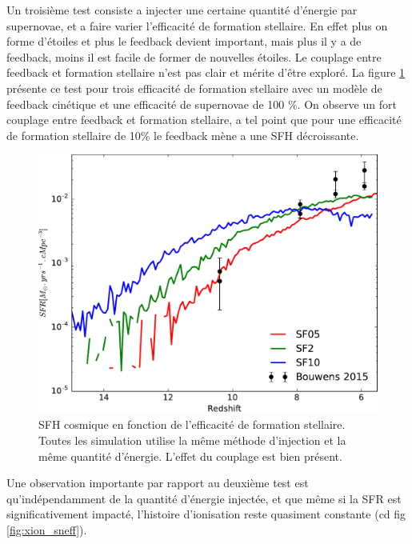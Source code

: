 Un troisième test consiste a injecter une certaine quantité d'énergie par supernovae, et a faire varier l'efficacité de formation stellaire.
En effet plus on forme d'étoiles et plus le feedback devient important, mais plus il y a de feedback, moins il est facile de former de nouvelles étoiles.
Le couplage entre feedback et formation stellaire n'est pas clair et mérite d'être exploré.
La figure \ref{fig:sfr_sfe} présente ce test pour trois efficacité de formation stellaire avec un modèle de feedback cinétique et une efficacité de supernovae de 100 \%.
On observe un fort couplage entre feedback et formation stellaire, a tel point que pour une efficacité de formation stellaire de 10\% le feedback mène a une SFH décroissante.

\begin{figure}[bth]
        \includegraphics[width=.95\textwidth]{img/03/sedov/SFR_sfeff.pdf} 
        \caption{SFH cosmique en fonction de l'efficacité de formation stellaire.
        Toutes les simulation utilise la même méthode d'injection et la même quantité d'énergie.
		L'effet du couplage est bien présent.
        }
 		\label{fig:sfr_sfe}
\end{figure}

Une observation importante par rapport au deuxième test est qu’indépendamment de la quantité d'énergie injectée, et que même si la SFR est significativement impacté, l'histoire d'ionisation reste quasiment constante (cd fig \ref{fig:xion_sneff}).


